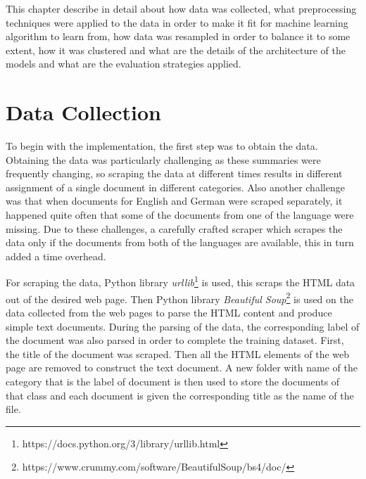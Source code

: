 
This chapter describe in detail about how data was collected, what preprocessing techniques were applied to the data in order to make it fit for machine learning algorithm to learn from, how data was resampled in order to balance it to some extent, how it was clustered and what are the details of the architecture of the models and what are the evaluation strategies applied.

\section{Data Collection}

To begin with the implementation, the first step was to obtain the data. Obtaining the data was particularly  challenging as these summaries were frequently changing, so scraping the data at different times results in different assignment of a single document in different categories. Also another challenge was that when documents for English and German were scraped separately, it happened quite often that some of the documents from one of the language were missing. Due to these challenges, a carefully crafted scraper which scrapes the data only if the documents from both of the languages are available, this in turn added a time overhead.

For scraping the data, Python library \textit{urllib}\footnote{https://docs.python.org/3/library/urllib.html} is used, this scraps the HTML data out of the desired web page. Then Python library \textit{Beautiful Soup}\footnote{https://www.crummy.com/software/BeautifulSoup/bs4/doc/} is used on the data collected from the web pages to parse the HTML content and produce simple text documents. During the parsing of the data, the corresponding label of the document was also parsed in order to complete the training dataset. First, the title of the document was scraped. Then all the HTML elements of the web page are removed to construct the text document. A new folder with name of the category that is the label of document is then used to store the documents of that class and each document is given the corresponding title as the name of the file.

